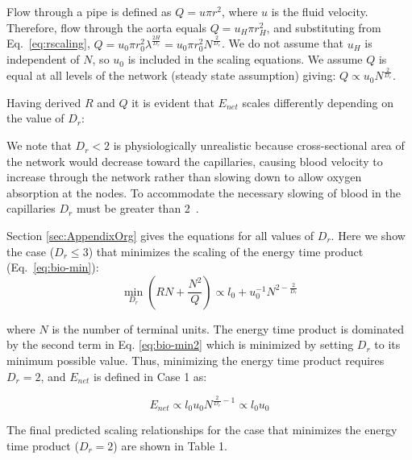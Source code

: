 \documentclass[12pt]{article}
\begin{document}
Flow through a pipe is defined as $Q = u\pi r^2$, where $u$ is the fluid
velocity. 
Therefore, flow through the aorta equals $Q = u_H \pi r_{H}^2$, and
substituting from Eq.~\ref{eq:rscaling}, $Q = u_0 \pi r_0^2
\lambda^{\frac{2H}{D_r}} = u_0 \pi r_0^2N^{\frac{2}{D_r}} $.  We do not assume
that $u_H$ is independent of $N$, so $u_0$ is included in the scaling
equations.  We assume $Q$ is equal at all levels of the network (steady state
assumption) giving: $Q \propto u_0 N^{\frac{2}{D_r}}$. 

Having derived $R$ and $Q$ it is evident that $E_{net}$ scales differently
depending on the value of $D_r$:

\begin{caseof}

\end{caseof}
\noindent We note that $D_r < 2$ is physiologically unrealistic because cross-sectional area of the network would decrease toward the capillaries, causing blood velocity to increase through the network
rather than slowing down to allow oxygen absorption at the nodes. To
accommodate the necessary slowing of blood in the capillaries $D_r$ must be
greater than 2~\cite{west97}.

Section \ref{sec:AppendixOrg} gives the equations
for all values of $D_r$. Here we show the case ($D_r \leq 3$) that minimizes
the scaling of the energy time product (Eq.~\ref{eq:bio-min}):
\begin{equation}
  \min_{D_r} (RN + \frac{N^2}{Q})
  \propto l_0 + u_0^{-1}N^{2-\frac{2}{D_r}}
\label{eq:bio-min2}
\end{equation}

\noindent where $N$ is the number of terminal units.  The energy time product is dominated by the second term in Eq.
\ref{eq:bio-min2} which is minimized by setting $D_r$ to its minimum possible
value. Thus, minimizing the energy time product requires $D_r = 2$, and 
 $E_{net}$ is defined in Case 1 as: 

\begin{equation}
E_{net} \propto l_0 u_0 N^{\frac{2}{D_r}-1} \propto l_0 u_0
\label{eq:EnetOrg}
\end{equation}


\noindent The final predicted scaling relationships for the case that minimizes the energy time product ($D_r = 2$) are shown in Table 1.
\end{document}
